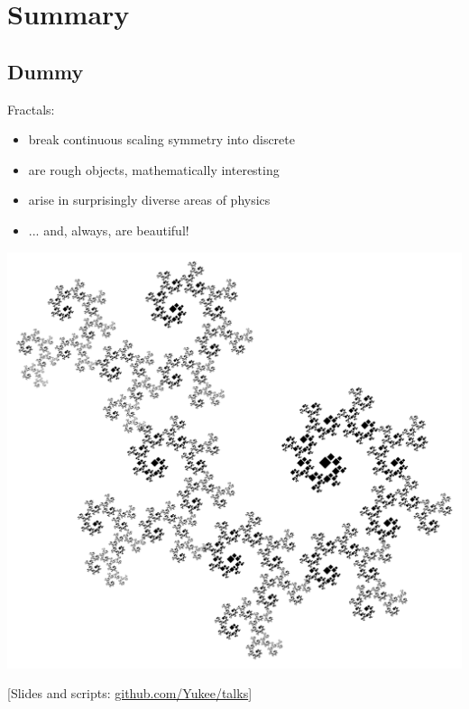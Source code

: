 \documentclass[xcolor=x11names,compress,professionalfonts]{beamer}
\renewcommand{\(}{\begin{columns}}
\renewcommand{\)}{\end{columns}}
\newcommand{\<}[1]{\begin{column}{#1}}
\renewcommand{\>}{\end{column}}
\begin{document}
\section{Summary}
\subsection{Dummy}

\begin{frame}{Fractals:}
    \begin{itemize}
        \item break continuous scaling symmetry into discrete
        \item are rough objects, mathematically interesting
        \item arise in surprisingly diverse areas of physics
        \item ... and, always, are beautiful!
    \end{itemize}
    
     {\centering
    	\includegraphics[scale=.14]{dragon.png}
    	
     }
\scriptsize
[Slides and scripts: \href{https://github.com/Yukee/talks/}{github.com/Yukee/talks}]
\end{frame}
\end{document}
